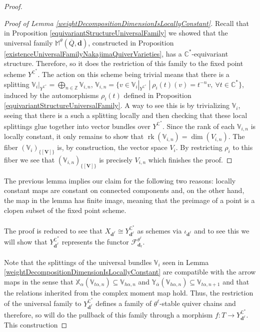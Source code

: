 \documentclass{amsart}
\theoremstyle{plain}
\numberwithin{equation}{section}
\theoremstyle{definition}
\theoremstyle{remark}
\begin{document}
\begin{proof}
\begin{proof}[Proof of Lemma \ref{weightDecompositionDimensionIsLocallyConstant}]
			Recall that in Proposition \ref{equivariantStructureUniversalFamily} we showed that the universal family $\mathbb{M}^{\theta}(\overline{Q},\mathbf{d})$, constructed in Proposition \ref{existenceUniversalFamilyNakajimaQuiverVarieties}, has a $\mathbb{C}^*$-equivariant structure. Therefore, so it does the restriction of this family to the fixed point scheme $Y^{\mathbb{C}^*}$. The action on this scheme being trivial means that there is a splitting $\mathbb{V}_{i}|_{Y^{\mathbb{C}^*}}=\bigoplus_{n\in\mathbb{Z}} \mathbb{V}_{i,n}$, $\mathbb{V}_{i,n}=\{v\in \mathbb{V}_{i}|_{Y^{\mathbb{C}^*}}\ | \ \rho_i(t)(v)=t^{-n}v, \ \forall t\in\mathbb{C}^*\}$, induced by the automorphisms $\rho_i(t)$ defined in Proposition \ref{equivariantStructureUniversalFamily}. A way to see this is by trivializing $\mathbb{V}_i$, seeing that there is a such a splitting locally and then checking that these local splittings glue together into vector bundles over $Y^{\mathbb{C}^*}$. Since the rank of each $\mathbb{V}_{i,n}$ is locally constant, it only remains to show that $\operatorname{rk}(\mathbb{V}_{i,n})=\dim(V_{i,n})$. The fiber $(\mathbb{V}_{i})_{\{[\mathbf{V}]\}}$ is, by construction, the vector space $V_i$. By restricting $\rho_i$ to this fiber we see that $(\mathbb{V}_{i,n})_{\{[\mathbf{V}]\}}$ is precisely $V_{i,n}$ which finishes the proof. 
		\end{proof}
		The previous lemma implies our claim for the following two reasons: locally constant maps are constant on connected components and, on the other hand, the map in the lemma has finite image, meaning that the preimage of a point is a clopen subset of the fixed point scheme. 
		\\
		\\
		The proof is reduced to see that $X_{\mathbf d^\ell}\cong Y^{\mathbb C^*}_{\mathbf d^\ell}$ as schemes via $\iota_{\mathbf{d}^\ell}$ and to see this we will show that $Y^{\mathbb{C}^*}_{\mathbf{d}^\ell}$ represents the functor $\mathcal{F}_{\mathbf{d}_\ell}^{\theta^\ell}$. 
		\\
		\\
		Note that the splittings of the universal bundles $\mathbb{V}_i$ seen in Lemma \ref{weightDecompositionDimensionIsLocallyConstant} are compatible with the arrow maps in the sense that $
		\mathbb{X}_\alpha(\mathbb V_{t\alpha,n})
		\subseteq
		\mathbb V_{h\alpha,n}
		$
		and
		$
		\mathbb{Y}_{\overline\alpha}(\mathbb V_{h\alpha,n})
		\subseteq
		\mathbb V_{t\alpha,n+1}
		$ and that the relations inherited from the complex moment map hold. Thus, the restriction of the universal family to $Y^{\mathbb{C}^*}_{\mathbf{d}^\ell}$ defines a family of $\theta^\ell$-stable quiver chains and therefore, so will do the pullback of this family through a morphism $f:T\to Y^{\mathbb{C}^*}_{\mathbf{d}^\ell}$. This construction

\end{proof}
\end{document}
